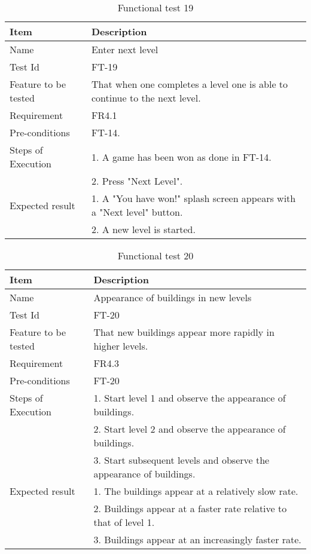 \begin{table}[H]
\centering
	\begin{tabular}{ l | p{8cm} }
		\hline
		{\bf Item} & {\bf Description} \\ \hline
		Name & Enter next level \\ 
		Test Id & FT-19 \\ 
		Feature to be tested & That when one completes a level one is able to continue to the next level. \\ 
		Requirement & FR4.1 \\ 
		Pre-conditions & FT-14.\\ 
		Steps of Execution & 1. A game has been won as done in FT-14.\\
		& 2. Press "Next Level". \\
		Expected result & 1. A "You have won!" splash screen appears with a "Next level" button. \\
		& 2. A new level is started. \\
	\end{tabular}
	\caption{Functional test 19}
\end{table}

\begin{table}[H]
\centering
	\begin{tabular}{ l | p{8cm} }
		\hline
		{\bf Item} & {\bf Description} \\ \hline
		Name & Appearance of buildings in new levels \\ 
		Test Id & FT-20 \\ 
		Feature to be tested & That new buildings appear more rapidly in higher levels. \\ 
		Requirement & FR4.3 \\ 
		Pre-conditions & FT-20 \\ 
		Steps of Execution & 1. Start level 1 and observe the appearance of buildings. \\ 
		& 2. Start level 2 and observe the appearance of buildings. \\
		& 3. Start subsequent levels and observe the appearance of buildings. \\
		Expected result & 1. The buildings appear at a relatively slow rate. \\
		& 2. Buildings appear at a faster rate relative to that of level 1. \\
		& 3. Buildings appear at an increasingly faster rate. \\
	\end{tabular}
	\caption{Functional test 20}
\end{table}

